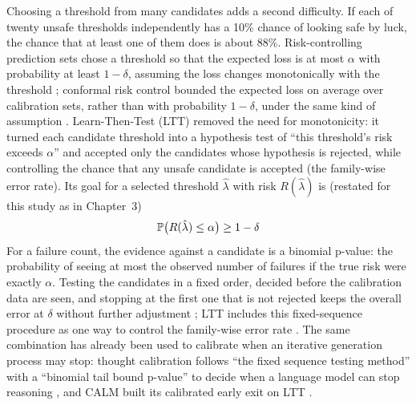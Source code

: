 Choosing a threshold from many candidates adds a second difficulty. If each of twenty unsafe thresholds independently has a 10\% chance of looking safe by luck, the chance that at least one of them does is about 88\%. Risk-controlling prediction sets chose a threshold so that the expected loss is at most $\alpha$ with probability at least $1-\delta$, assuming the loss changes monotonically with the threshold \parencite{bates2021rcps}; conformal risk control bounded the expected loss on average over calibration sets, rather than with probability $1-\delta$, under the same kind of assumption \parencite{angelopoulos2024crc}. Learn-Then-Test (LTT) removed the need for monotonicity: it turned each candidate threshold into a hypothesis test of ``this threshold's risk exceeds $\alpha$'' and accepted only the candidates whose hypothesis is rejected, while controlling the chance that any unsafe candidate is accepted (the family-wise error rate). Its goal for a selected threshold $\hat\lambda$ with risk $R(\hat\lambda)$ is \parencite{angelopoulos2025ltt} (restated for this study as  in Chapter~3)
\begin{equation}
\P\big( R(\hat\lambda) \le \alpha \big) \ge 1-\delta
\label{eq:rrl-ltt}
\end{equation}
For a failure count, the evidence against a candidate is a binomial p-value: the probability of seeing at most the observed number of failures if the true risk were exactly $\alpha$. Testing the candidates in a fixed order, decided before the calibration data are seen, and stopping at the first one that is not rejected keeps the overall error at $\delta$ without further adjustment \parencite{bauer1991}; LTT includes this fixed-sequence procedure as one way to control the family-wise error rate \parencite{angelopoulos2025ltt}. The same combination has already been used to calibrate when an iterative generation process may stop: thought calibration follows \enquote{the fixed sequence testing method} with a \enquote{binomial tail bound p-value} to decide when a language model can stop reasoning \parencite[p.~14295]{wu2025thought}, and CALM built its calibrated early exit on LTT \parencite{schuster2022calm}.

